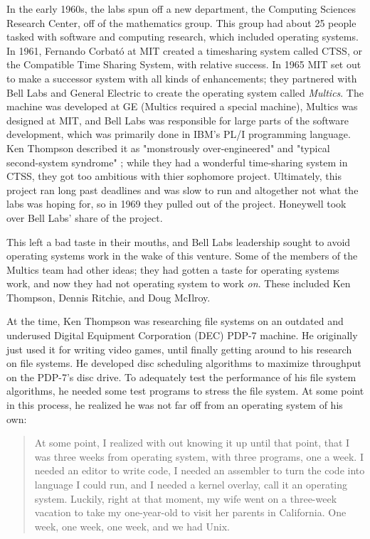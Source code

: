 In the early 1960s, the labs spun off a new department, the Computing Sciences Research Center,
off of the mathematics group. This group had about 25 people tasked with software and computing
research, which included operating systems.
In 1961, Fernando Corbat\'{o} at MIT created a timesharing system called CTSS,
or the Compatible Time Sharing System, with relative success.
In 1965 MIT set out to make a successor system with all kinds of enhancements; they partnered with
Bell Labs and General Electric to create the operating system called \textit{Multics}.
The machine was developed at GE (Multics required a special machine), Multics was designed at MIT,
and Bell Labs was responsible for large parts of the software development,
which was primarily done in IBM's PL/I programming language.
Ken Thompson described it as "monstrously over-engineered" and "typical second-system syndrome"
\cite{kernighan_interviews_thompson_2019};
while they had a wonderful time-sharing system in CTSS, they got too ambitious with thier sophomore project.
Ultimately, this project ran long past deadlines and was slow to run and altogether not what
the labs was hoping for, so in 1969 they pulled out of the project.
Honeywell took over Bell Labs' share of the project.

This left a bad taste in their mouths, and Bell Labs leadership sought to avoid operating
systems work in the wake of this venture.
Some of the members of the Multics team had other ideas; they had gotten a taste for
operating systems work, and now they had not operating system to work \textit{on}.
These included Ken Thompson, Dennis Ritchie, and Doug McIlroy.

At the time, Ken Thompson was researching file systems on an outdated and underused
Digital Equipment Corporation (DEC) PDP-7 machine.
He originally just used it for writing video games, until finally getting around to
his research on file systems.
He developed disc scheduling algorithms to maximize throughput on the PDP-7's disc drive.
To adequately test the performance of his file system algorithms, he needed some test
programs to stress the file system.
At some point in this process, he realized he was not far off from an
operating system of his own\cite{kernighan_interviews_thompson_2019}:

\begin{quotation}
At some point, I realized with out knowing it up until that point, that I was 
three weeks from operating system, with three programs, one a week. I needed an 
editor to write code, I needed an assembler to turn the code into language I 
could run, and I needed a kernel overlay, call it an operating system.  
Luckily, right at that moment, my wife went on a three-week vacation to take my 
one-year-old to visit her parents in California. One week, one week, one week, 
and we had Unix.
\end{quotation}

